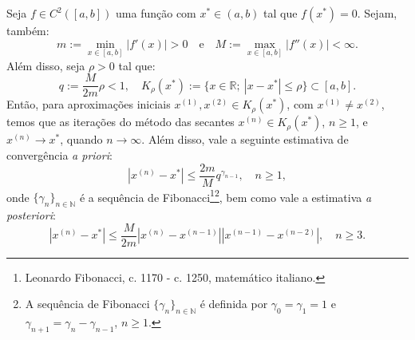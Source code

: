 \begin{teo}\label{teo:metodo_das_secantes}
  Seja $f\in C^2([a, b])$ uma função com $x^*\in (a, b)$ tal que $f(x^*) = 0$. Sejam, também:
  \begin{equation}
    m := \min_{x\in [a, b]} |f'(x)| > 0\quad\text{e}\quad M := \max_{x\in [a,b]} |f''(x)| < \infty.
  \end{equation}
Além disso, seja $\rho > 0$ tal que:
\begin{equation}
  q := \frac{M}{2m}\rho < 1,\quad K_\rho(x^*) := \{x\in\mathbb{R};~|x-x^*|\leq \rho\}\subset [a, b].
\end{equation}
Então, para aproximações iniciais $x^{(1)}, x^{(2)}\in K_\rho(x^*)$, com $x^{(1)}\neq x^{(2)}$, temos que as iterações do método das secantes $x^{(n)}\in K_\rho(x^*)$, $n\geq 1$, e $x^{(n)}\to x^*$, quando $n\to\infty$. Além disso, vale a seguinte estimativa de convergência \emph{a priori}:
\begin{equation}
  |x^{(n)} - x^*| \leq \frac{2m}{M}q^{\gamma_{n-1}},\quad n\geq 1,
\end{equation}
onde $\{\gamma_n\}_{n\in\mathbb{N}}$ é a sequência de Fibonacci\footnote{Leonardo Fibonacci, c. 1170 - c. 1250, matemático italiano.}\footnote{A sequência de Fibonacci $\{\gamma_n\}_{n\in\mathbb{N}}$ é definida por $\gamma_0 = \gamma_1 = 1$ e $\gamma_{n+1} = \gamma_{n} - \gamma_{n-1}$, $n\geq 1$.}, bem como vale a estimativa \emph{a posteriori}:
\begin{equation}
  |x^{(n)} - x^*| \leq \frac{M}{2m}|x^{(n)}-x^{(n-1)}||x^{(n-1)}-x^{(n-2)}|,\quad n\geq 3.
\end{equation}
\end{teo}
